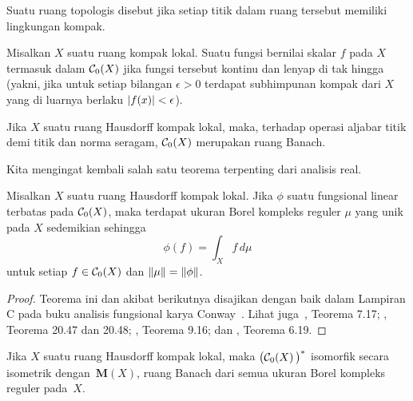 \begin{defn} Suatu ruang topologis disebut
 jika setiap titik dalam ruang tersebut memiliki lingkungan kompak.
\end{defn}

\begin{notn} Misalkan $X$ suatu ruang kompak lokal. Suatu fungsi bernilai skalar $f$ pada $X$ termasuk dalam $\mathcal{C}_0(X)$ jika
fungsi tersebut kontinu dan lenyap di tak hingga (yakni, jika untuk setiap bilangan $\epsilon > 0$ terdapat subhimpunan kompak
dari $X$ yang di luarnya berlaku $\lvert f(x)\rvert < \epsilon$).
\end{notn}

\begin{exam}\label{exam_C0X} Jika $X$ suatu ruang Hausdorff kompak lokal, maka, terhadap operasi aljabar titik demi titik dan norma seragam,
$\mathcal{C}_0(X)$ merupakan ruang Banach.
\end{exam}

Kita mengingat kembali salah satu teorema terpenting dari analisis real.

\begin{thm}\label{C057951} Misalkan $X$ suatu ruang Hausdorff kompak lokal.
Jika $\phi$ suatu fungsional linear terbatas pada $\mathcal{C}_0(X)$, maka terdapat ukuran Borel kompleks reguler
$\mu$ yang unik pada $X$ sedemikian sehingga
  \[ \phi(f) = \int_X f\,d\mu \]
untuk setiap $f \in \mathcal{C}_0(X)$ dan $\lVert\mu\rVert = \lVert\phi\rVert$.
\end{thm}

\begin{proof} Teorema ini dan akibat berikutnya disajikan dengan baik dalam Lampiran C pada buku analisis
fungsional karya Conway~\cite{Conway:1990}. Lihat juga~\cite{Folland:1984}, Teorema 7.17; \cite{HewittS:1965},
Teorema 20.47 dan 20.48; \cite{McDonaldW:1999}, Teorema 9.16; dan \cite{Rudin:1987}, Teorema 6.19.  \ns
\end{proof}

\begin{cor}\label{C057952} Jika $X$ suatu ruang Hausdorff kompak lokal, maka $\bigl(\mathcal{C}_0(X)\,\bigr)^*$
isomorfik secara isometrik dengan~$\textbf{M}(X)$,
ruang Banach dari semua ukuran Borel kompleks reguler pada~$X$.
\end{cor}

